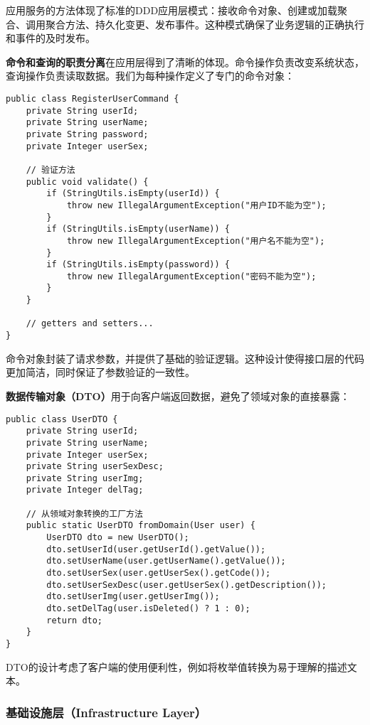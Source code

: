\documentclass[a4paper,12pt]{article}
\begin{document}
应用服务的方法体现了标准的DDD应用层模式：接收命令对象、创建或加载聚合、调用聚合方法、持久化变更、发布事件。这种模式确保了业务逻辑的正确执行和事件的及时发布。

\textbf{命令和查询的职责分离}在应用层得到了清晰的体现。命令操作负责改变系统状态，查询操作负责读取数据。我们为每种操作定义了专门的命令对象：

\begin{lstlisting}[caption=注册用户命令对象]
public class RegisterUserCommand {
    private String userId;
    private String userName;
    private String password;
    private Integer userSex;
    
    // 验证方法
    public void validate() {
        if (StringUtils.isEmpty(userId)) {
            throw new IllegalArgumentException("用户ID不能为空");
        }
        if (StringUtils.isEmpty(userName)) {
            throw new IllegalArgumentException("用户名不能为空");
        }
        if (StringUtils.isEmpty(password)) {
            throw new IllegalArgumentException("密码不能为空");
        }
    }
    
    // getters and setters...
}
\end{lstlisting}

命令对象封装了请求参数，并提供了基础的验证逻辑。这种设计使得接口层的代码更加简洁，同时保证了参数验证的一致性。

\textbf{数据传输对象（DTO）}用于向客户端返回数据，避免了领域对象的直接暴露：

\begin{lstlisting}[caption=用户DTO设计]
public class UserDTO {
    private String userId;
    private String userName;
    private Integer userSex;
    private String userSexDesc;
    private String userImg;
    private Integer delTag;
    
    // 从领域对象转换的工厂方法
    public static UserDTO fromDomain(User user) {
        UserDTO dto = new UserDTO();
        dto.setUserId(user.getUserId().getValue());
        dto.setUserName(user.getUserName().getValue());
        dto.setUserSex(user.getUserSex().getCode());
        dto.setUserSexDesc(user.getUserSex().getDescription());
        dto.setUserImg(user.getUserImg());
        dto.setDelTag(user.isDeleted() ? 1 : 0);
        return dto;
    }
}
\end{lstlisting}

DTO的设计考虑了客户端的使用便利性，例如将枚举值转换为易于理解的描述文本。

\subsubsection{基础设施层（Infrastructure Layer）}
\end{document}
